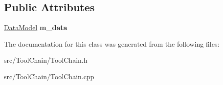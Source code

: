 \subsection*{Public Attributes}
\begin{DoxyCompactItemize}
\item 
\hypertarget{classToolChain_a92c81316d0c0b16ee9e4a084dd976f83}{\hyperlink{classDataModel}{Data\-Model} {\bfseries m\-\_\-data}}\label{classToolChain_a92c81316d0c0b16ee9e4a084dd976f83}

\end{DoxyCompactItemize}


The documentation for this class was generated from the following files\-:\begin{DoxyCompactItemize}
\item 
src/\-Tool\-Chain/Tool\-Chain.\-h\item 
src/\-Tool\-Chain/Tool\-Chain.\-cpp\end{DoxyCompactItemize}
